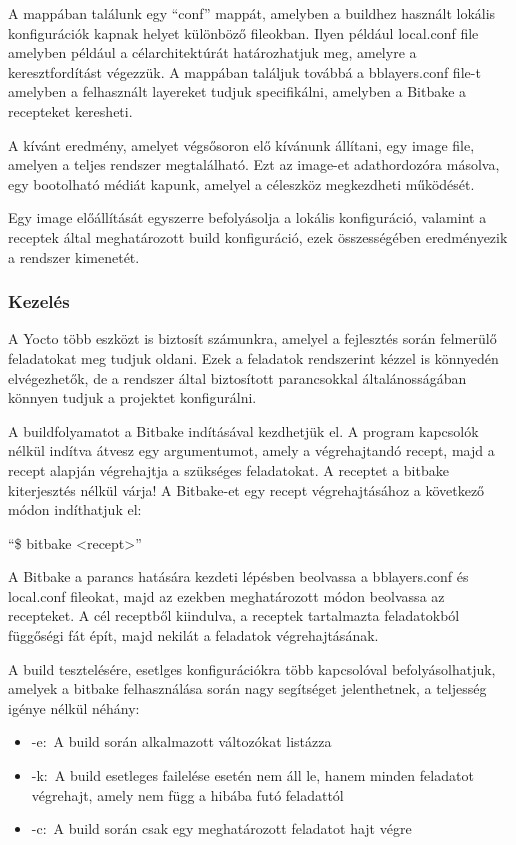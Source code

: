 A mappában találunk egy ``conf'' mappát, amelyben a buildhez használt lokális
konfigurációk kapnak helyet különböző fileokban. Ilyen például local.conf file
amelyben például a célarchitektúrát határozhatjuk meg, amelyre a keresztfordítást
végezzük. A mappában találjuk továbbá a bblayers.conf file-t amelyben a
felhasznált layereket tudjuk specifikálni, amelyben a Bitbake a recepteket
keresheti. 

\medskip

A kívánt eredmény, amelyet végsősoron elő kívánunk állítani, egy image file,
amelyen a teljes rendszer megtalálható. Ezt az image-et adathordozóra másolva,
egy bootolható médiát kapunk, amelyel a céleszköz megkezdheti működését. 

Egy image előállítását egyszerre befolyásolja a lokális konfiguráció, valamint a
receptek által meghatározott build konfiguráció, ezek összességében eredményezik
a rendszer kimenetét. 

\subsubsection{Kezelés}

A Yocto több eszközt is biztosít számunkra, amelyel a fejlesztés során felmerülő
feladatokat meg tudjuk oldani. Ezek a feladatok rendszerint kézzel is könnyedén
elvégezhetők, de a rendszer által biztosított parancsokkal általánosságában
könnyen tudjuk a projektet konfigurálni.

\medskip

A buildfolyamatot a Bitbake indításával kezdhetjük el. A program kapcsolók nélkül
indítva átvesz egy argumentumot, amely a végrehajtandó recept, majd a recept
alapján végrehajtja a szükséges feladatokat. A receptet a bitbake kiterjesztés
nélkül várja! A Bitbake-et egy recept végrehajtásához a következő módon
indíthatjuk el:

``\$ bitbake <recept>''

A Bitbake a parancs hatására kezdeti lépésben beolvassa a bblayers.conf és
local.conf fileokat, majd az ezekben meghatározott módon beolvassa az
recepteket. A cél receptből kiindulva, a receptek tartalmazta feladatokból
függőségi fát épít, majd nekilát a feladatok végrehajtásának.

A build tesztelésére, esetlges konfigurációkra több kapcsolóval befolyásolhatjuk,
amelyek a bitbake felhasználása során nagy segítséget jelenthetnek, a teljesség
igénye nélkül néhány:

\begin{itemize}
\item{-e:~A build során alkalmazott változókat listázza}
\item{-k:~A build esetleges failelése esetén nem áll le, hanem minden feladatot
  végrehajt, amely nem függ a hibába futó feladattól}
\item{-c:~A build során csak egy meghatározott feladatot hajt végre}
\end{itemize}

